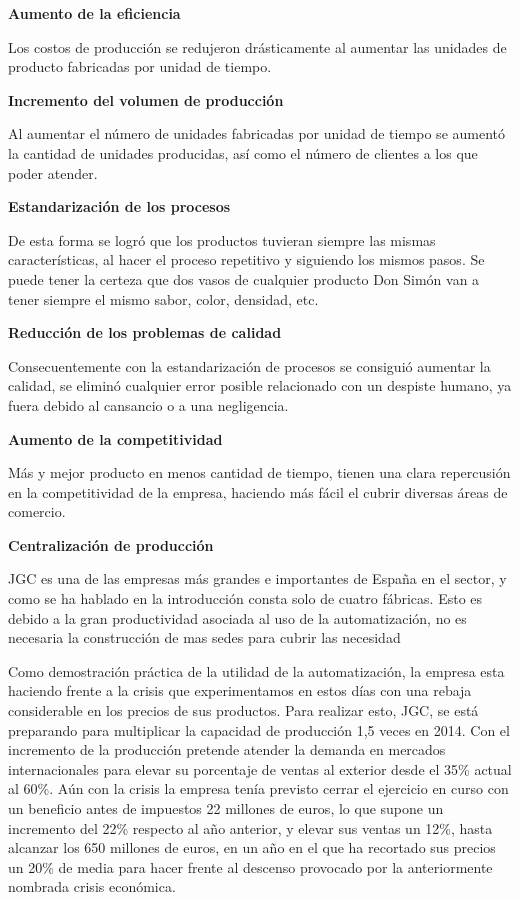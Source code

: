\documentclass[11pt,a4paper,spanish,twoside]{report}
\begin{document}
\begin{description}
\item \textbf{Aumento de la eficiencia}

Los costos de producción se redujeron drásticamente al aumentar las unidades 
de producto fabricadas por unidad de tiempo.

\item \textbf{Incremento del volumen de producción}

Al aumentar el número de unidades fabricadas por unidad de tiempo se aumentó
la cantidad de unidades producidas, así como el número de clientes a los que
poder atender.

\item \textbf{Estandarización de los procesos}

De esta forma se logró que los productos tuvieran siempre las mismas
características, al hacer el proceso repetitivo y siguiendo los mismos
pasos. Se puede tener la certeza que dos vasos de cualquier producto Don
Simón van a tener siempre el mismo sabor, color, densidad, etc.

\item \textbf{Reducción de los problemas de calidad}

Consecuentemente con la estandarización de procesos se consiguió aumentar la
calidad, se eliminó cualquier error posible relacionado con un despiste
humano, ya fuera debido al cansancio o a una negligencia. 

\item \textbf{Aumento de la competitividad}

Más y mejor producto en menos cantidad de tiempo, tienen una clara repercusión
en la competitividad de la empresa, haciendo más fácil el cubrir diversas áreas
de comercio.

\item \textbf{Centralización de producción}

JGC es una de las empresas más grandes e importantes de España en el sector,
y como se ha hablado en la introducción consta solo de cuatro fábricas. Esto
es debido a la gran productividad asociada al uso de la automatización, no es
necesaria la construcción de mas sedes para cubrir las necesidad

\end{description}

Como demostración práctica de la utilidad de la automatización, la empresa
esta haciendo frente a la crisis que experimentamos en estos días con una
rebaja considerable en los precios de sus productos. Para realizar esto, JGC,
se está preparando para multiplicar la capacidad de producción 1,5 veces en
2014. Con el incremento de la producción pretende atender la demanda en
mercados internacionales para elevar su porcentaje de ventas al exterior
desde el 35\% actual al 60\%. Aún con la crisis la empresa tenía previsto
cerrar el ejercicio en curso con un beneficio antes de impuestos 22 millones
de euros, lo que supone un incremento del 22\% respecto al año anterior, y
elevar sus ventas un 12\%, hasta alcanzar los 650 millones de euros, en un
año en el que ha recortado sus precios un 20\% de media para hacer frente al
descenso provocado por la anteriormente nombrada crisis económica.
\end{document}
